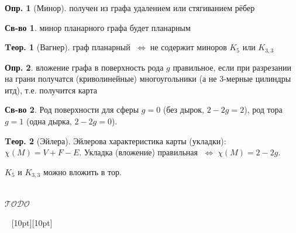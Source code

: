 \documentclass[a4paper,12pt]{article}
\numberwithin{figure}{section}
\theoremstyle{definition}
\newtheorem{definition}{Опр.}[section]
\newtheorem*{property}{Св-во}  %
\theoremstyle{definition}
\newtheorem{theorem}{Tеор.}[section]
\def\iiff{$\;\Longleftrightarrow\;$}
\def\iiTODO{\guillemotleft$\mathcal{TODO}$\guillemotright\textellipsis}
\begin{document}
\begin{definition}[Минор]
	получен из графа удалением или стягиванием рёбер
\end{definition}

\begin{property}
	минор планарного графа будет планарным
\end{property}

\begin{theorem}[Вагнер]
	граф планарный \iiff не содержит миноров $K_5$ или $K_{3,3}$
\end{theorem}

\begin{definition}
	вложение графа в поверхность рода $g$ правильное, если при разрезании на грани получатся (криволинейные) многоугольники (а не 3-мерные цилиндры итд), т.е. получится карта
\end{definition}

\begin{property}
	Род поверхности для сферы $g=0$ (без дырок, $2-2g=2$), род тора $g=1$ (одна дырка, $2-2g=0$).
\end{property}

\begin{theorem}[Эйлера]
	Эйлерова характеристика карты (укладки): $\chi(M) = V+F-E$.
	Укладка (вложение) правильная \iiff $\chi(M) = 2-2g$.
\end{theorem}

$K_5$ и $K_{3,3}$ можно вложить в тор.

\ \\ \iiTODO



\vspace{48pt} \noindent \hrulefill~ \raisebox{-8pt}[10pt][10pt]{\Huge{}}~ \hrulefill
\end{document}
